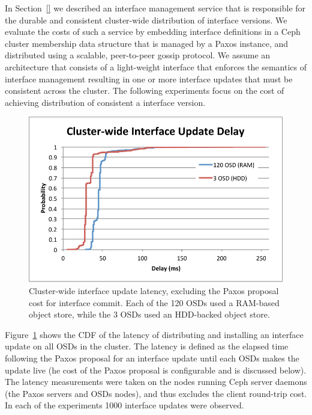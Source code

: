 \documentclass[10pt,twocolumn]{article}
\begin{document}
In Section~\ref{} we described an interface management service that is
responsible for the durable and consistent cluster-wide distribution of
interface versions. We evaluate the costs of such a service by embedding
interface definitions in a Ceph cluster membership data structure that is
managed by a Paxos instance, and distributed using a scalable, peer-to-peer
gossip protocol. We assume an architecture that consists of a light-weight
interface that enforces the semantics of interface management resulting in one
or more interface updates that must be consistent across the cluster. The
following experiments focus on the cost of achieving distribution of consistent
a interface version.

\begin{figure}[h]
\centering
\includegraphics{figures/iface-update-delay.pdf}
\caption{Cluster-wide interface update latency, excluding the Paxos proposal cost for
interface commit. Each of the 120 OSDs used a RAM-based object store, while the
3 OSDs used an HDD-backed object store.}
\label{fig:propdelay}
\end{figure}

Figure~\ref{fig:propdelay} shows the CDF of the latency of distributing and
installing an interface update on all OSDs in the cluster. The latency is
defined as the elapsed time following the Paxos proposal for an interface
update until each OSDs makes the update live (he cost of the Paxos proposal is
configurable and is discussed below). The latency measurements were taken on
the nodes running Ceph server daemons (the Paxos servers and OSDs nodes), and
thus excludes the client round-trip cost. In each of the experiments 1000
interface updates were observed.
\end{document}
